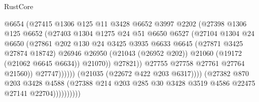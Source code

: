 \begin{lexlean}{RustCore}
\begin{coremodule}
                                      @6654
                                      (@27415
                                        @1306
                                        @125
                                        @11
                                        @3428
                                        @6652
                                        @3997
                                        @2202
                                        (@27398
                                          @1306
                                          @125
                                          @6652
                                          (@27403
                                            @1304
                                            @1275
                                            @24
                                            @51
                                            @6650
                                            @6527
                                            (@27104
                                              @1304
                                              @24
                                              @6650
                                              (@27861
                                                @202
                                                @130
                                                @24
                                                @3425
                                                @3935
                                                @6633
                                                @6645
                                                (@27871 @3425 @27874 @18742)
                                                @26946
                                                @26950
                                                (@21043 (@26952 @202))
                                                @21060
                                                (@19172 (@21062 @6645 @6634))
                                                @21070))
                                            @27821))
                                        @27755
                                        @27758
                                        @27761
                                        @27764
                                        @21560))
                                    @27747))))))
                        (@21035 (@22672 @422 @203 @6317))))
                    (@27382
                      @870
                      @203
                      @3428
                      @4588
                      (@27388 @214 @203 @285 @30 @3428 @3519 @4586 @22475 @27141 @22704))))))))))

\end{coremodule}
\end{lexlean}
